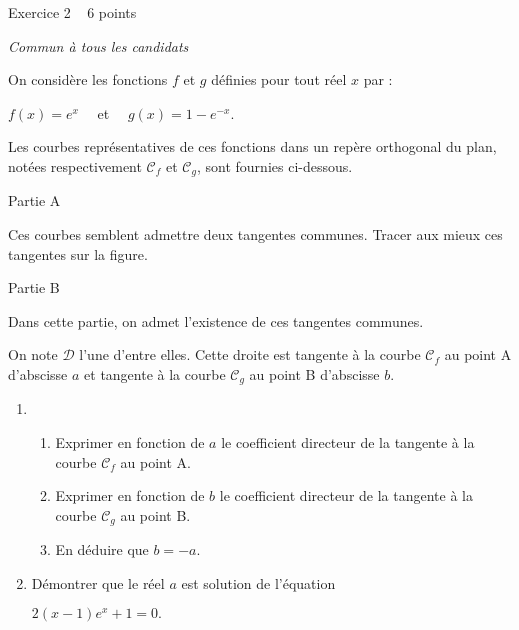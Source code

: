 
%
\begin{h2}Exercice 2   6 points\end{h2}
\textit{Commun à tous les candidats}
\par
On considère les fonctions $f$ et $g$ définies pour tout réel $x$ par :

\begin{center}
$f\left(x\right)=e^{x} \quad $     et    $ \quad  g\left(x\right)=1-e^{-x}.$
\end{center}
Les courbes représentatives de ces fonctions dans un repère orthogonal du plan, notées respectivement $\mathscr C_{f}$ et $\mathscr C_{g}$, sont fournies ci-dessous.

\begin{center}
\end{center}
\begin{h3}Partie A\end{h3}
Ces courbes semblent admettre deux tangentes communes. Tracer aux mieux ces tangentes sur la figure.
\begin{h3}Partie B\end{h3}
Dans cette partie, on admet l'existence de ces tangentes communes.
\par
On note $\mathscr D$ l'une d'entre elles. Cette droite est tangente à la courbe $\mathscr C_{f}$ au point A d'abscisse $a$ et tangente à la courbe $\mathscr C_{g}$ au point B d'abscisse $b$.
\begin{enumerate}
     \item
     \begin{enumerate}[label=\alph*.]
          \item
          Exprimer en fonction de $a$ le coefficient directeur de la tangente à la courbe $\mathscr C_{f}$ au point A.
          \item
          Exprimer en fonction de $b$ le coefficient directeur de la tangente à la courbe $\mathscr C_{g}$ au point B.
          \item
     En déduire que $b =-a$.\end{enumerate}
     \item
     Démontrer que le réel $a$ est solution de l'équation
     \begin{center}$2\left( x -1\right)e^{x}+1=0.$\end{center}
\end{enumerate}
